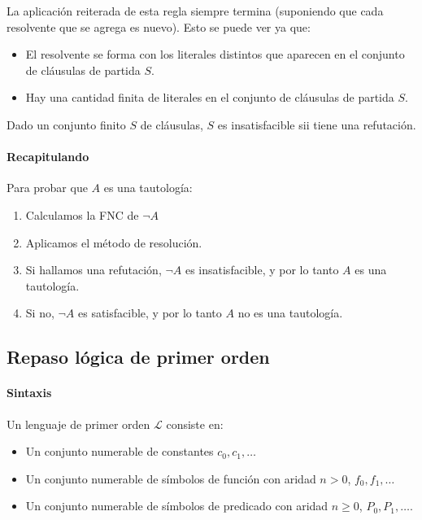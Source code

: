 La aplicación reiterada de esta regla siempre termina (suponiendo que cada resolvente que se agrega es nuevo). Esto se puede ver ya que:

\begin{itemize}
  \item El resolvente se forma con los literales distintos que aparecen en el conjunto de cláusulas de partida $S$.
  \item Hay una cantidad finita de literales en el conjunto de cláusulas de partida $S$.
\end{itemize}

\begin{teo}
  Dado un conjunto finito $S$ de cláusulas, $S$ es insatisfacible sii tiene una refutación.
\end{teo}

\paragraph{Recapitulando}

Para probar que $A$ es una tautología:
\begin{enumerate}
  \item Calculamos la FNC de $\lnot A$
  \item Aplicamos el método de resolución.
  \item Si hallamos una refutación, $\lnot A$ es insatisfacible, y por lo tanto $A$ es una tautología.
  \item Si no, $\lnot A$ es satisfacible, y por lo tanto $A$ no es una tautología.
\end{enumerate}

\subsection{Repaso lógica de primer orden}

\paragraph{Sintaxis}

Un lenguaje de primer orden $\mathcal{L}$ consiste en:

\begin{itemize}
  \item Un conjunto numerable de constantes $c_0, c_1, \dots$
  \item Un conjunto numerable de símbolos de función con aridad $n > 0$, $f_0, f_1, \dots$
  \item Un conjunto numerable de símbolos de predicado con aridad $n \geq 0$, $P_0, P_1, \dots$.
\end{itemize}

